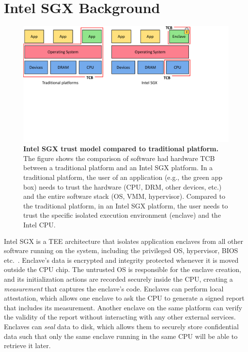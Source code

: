 \section{Intel SGX Background}
\label{ch:background:SGX}

\begin{figure}[t]
  \centering
    \includegraphics[trim={0 9cm 5cm 0},clip,width=\linewidth]{chapters/background/figures/SGX_trust.pdf}
    \caption[Intel SGX trust model compared to traditional platform]{\textbf{Intel SGX trust model compared to traditional platform.} The figure shows the comparison of software had hardware TCB between a traditional platform and an Intel SGX platform. In a traditional platform, the user of an application (e.g., the green app box) needs to trust the hardware (CPU, DRM, other devices, etc.) and the entire software stack (OS, VMM, hypervisor). Compared to the traditional platform, in an Intel SGX platform, the user needs to trust the specific isolated execution environment (enclave) and the Intel CPU.}
    \label{fig:sgx_trust_bg}
\end{figure}




Intel SGX is a TEE architecture that isolates application enclaves from all other software running on the system, including the privileged OS, hypervisor, BIOS etc.~\cite{sgxexplained}. Enclave's data is encrypted and integrity protected whenever it is moved outside the CPU chip. The untrusted OS is responsible for the enclave creation, and its initialization actions are recorded securely inside the CPU, creating a \emph{measurement} that captures the enclave's code. Enclaves can perform local attestation, which allows one enclave to ask the CPU to generate a signed report that includes its measurement. Another enclave on the same platform can verify the validity of the report without interacting with any other external services. Enclaves can \emph{seal} data to disk, which allows them to securely store confidential data such that only the same enclave running in the same CPU will be able to retrieve it later.



